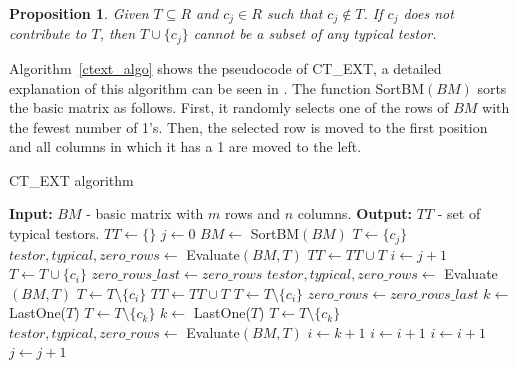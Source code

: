 \documentclass[authoryear,11pt]{elsarticle}
\newtheorem{proposition}{Proposition}
\begin{document}
	\begin{proposition}\label{prop1} 
	Given $T \subseteq R$ and $c_j \in R$ such that $c_j \notin T$. If $c_j$ 
	does not contribute to $T$, then $T\cup\{c_j\}$ cannot be a subset of any typical testor.
	\end{proposition}
	
	Algorithm~\ref{ctext_algo} shows the pseudocode of CT\_EXT, a detailed explanation of
	this algorithm can be seen in \citep{Sanchez07}. The function SortBM$(BM)$ sorts the basic matrix as follows.
	First, it randomly selects one of the rows of $BM$ with the fewest number of 1's. Then, the selected row is
	moved to the first position and all columns in which it has a 1 are moved to the left.
	
	\begin{algorithm}
	\begin{spacing}{1.0}
	\begin{small}
	\caption{CT\_EXT algorithm}\label{ctext_algo}
	\begin{algorithmic}[1]
	\State \textbf{Input: } $BM$ - basic matrix with $m$ rows and $n$ columns.
	\State \textbf{Output: } $TT$ - set of typical testors.
	\State $TT \gets \{\}$
	\State $j \gets 0$ 
	\State $BM \gets$ SortBM$(BM)$
	\label{row1condition}
	\State $T \gets \{c_j\}$ 
	\State $testor, typical, zero\_rows \gets$ Evaluate$(BM,T)$
	 
	\State $TT \gets TT \cup T$
	\EndIf
	\Else
	\State $i \gets j+1$
	\State $T \gets T \cup \{c_i\}$
	\State $zero\_rows\_last \gets zero\_rows$
	\State $testor, typical, zero\_rows \gets$ Evaluate$(BM,T)$
	\State $T \gets T \setminus \{c_i\}$ 
	\Else
	 
	\State $TT \gets TT \cup T$
	\EndIf
	\State $T \gets T \setminus \{c_i\}$
	\State $zero\_rows \gets zero\_rows\_last$
	\EndIf
	\EndIf
	\State $k \gets$ LastOne($T$)
	\State $T \gets T \setminus \{c_k\}$
	\State $k \gets$ LastOne($T$)
	\EndIf
	\State $T \gets T \setminus \{c_k\}$
	\State $testor, typical, zero\_rows \gets$ Evaluate$(BM,T)$
	\State $i \gets k+1$
	\Else
	\State $i \gets i+1$
	\EndIf
	\Else
	\State $i \gets i+1$
	\EndIf
	\EndWhile
	\EndIf
	\State $j \gets j+1$
	\EndWhile
	\end{algorithmic}
	\end{small}
	\end{spacing}
	\end{algorithm}
	
\end{document}
